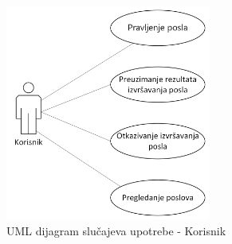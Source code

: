 \documentclass[12pt,oneside]{memoir}
\begin{document}
\begin{figure}[!ht]
  \centering
  \includegraphics[width=0.6\textwidth]{./images/dijagram_slucajeva_upotrebe_korisnik.png}
  \caption{UML dijagram slučajeva upotrebe - Korisnik}
  \label{fig:slucajupotrebe_korisnik}
\end{figure}

\end{document}
